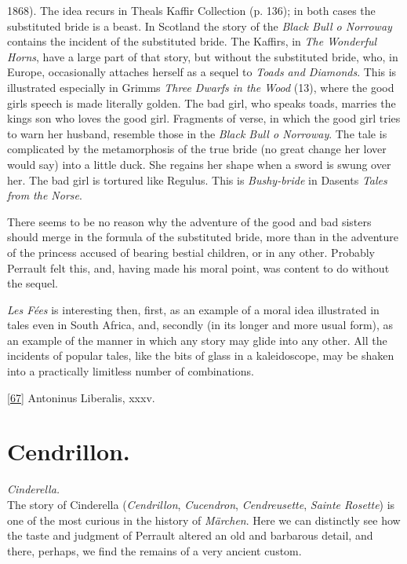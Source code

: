 \documentclass[14pt,a4paper]{memoir}
\begin{document}
1868). The idea recurs in Theal\textquotesingle s Kaffir Collection (p.
136); in both cases the substituted bride is a beast. In Scotland the
story of the \emph{Black Bull o\textquotesingle{} Norroway} contains the
incident of the substituted bride. The Kaffirs, in \emph{The Wonderful
Horns}, have a large part of that story, but without the substituted
bride, who, in Europe, occasionally attaches herself as a sequel to
\emph{Toads and Diamonds}. This is illustrated especially in
Grimm\textquotesingle s \emph{Three Dwarfs in the Wood} (13), where the
good girl\textquotesingle s speech is made literally golden. The bad
girl, who speaks toads, marries the king\textquotesingle s son who loves
the good girl. Fragments of verse, in which the good girl tries to warn
her husband, resemble those in the \emph{Black Bull o\textquotesingle{}
Norroway}. The tale is complicated by the metamorphosis of the true
bride (no great change her lover would say) into \textquotesingle a
little duck.\textquotesingle{} She regains her shape when a sword is
swung over her. The bad girl is tortured like Regulus. This is
\emph{Bushy-bride} in Dasent\textquotesingle s \emph{Tales from the
Norse}.

There seems to be no reason why the adventure of the good and bad
sisters should merge in the formula of the substituted bride, more than
in the adventure of the princess accused of bearing bestial children, or
in any other. Probably Perrault felt this, and, having made his moral
point, was content to do without the sequel.

\emph{Les Fées} is interesting then, first, as an example of a moral
idea illustrated in tales even in South Africa, and, secondly (in its
longer and more usual form), as an example of the manner in which any
story may glide into any other. All the incidents of popular tales, like
the bits of glass in a kaleidoscope, may be shaken into a practically
limitless number of combinations.

\protect\hypertarget{4533318093929944247_33931-h-1.htm.xhtmlux5cux23Footnote_67}{}{}\protect\hyperlink{4533318093929944247_33931-h-1.htm.xhtmlux5cux23FNanchor_67}{{{[}67{]}}}
Antoninus Liberalis, xxxv.

\section{Cendrillon.}

\emph{Cinderella.} \\

The story of Cinderella (\emph{Cendrillon}, \emph{Cucendron},
\emph{Cendreusette}, \emph{Sainte Rosette}) is one of the most curious
in the history of \emph{Märchen}. Here we can distinctly see how the
taste and judgment of Perrault altered an old and barbarous detail, and
there, perhaps, we find the remains of a very ancient custom.
\end{document}
